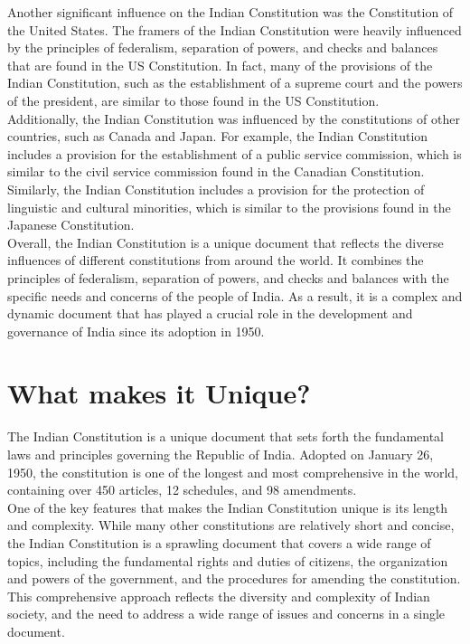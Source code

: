 \documentclass[11pt]{article}
\begin{document}
Another significant influence on the Indian Constitution was the Constitution of the United States. The framers of the Indian Constitution were heavily influenced by the principles of federalism, separation of powers, and checks and balances that are found in the US Constitution. In fact, many of the provisions of the Indian Constitution, such as the establishment of a supreme court and the powers of the president, are similar to those found in the US Constitution.\\

Additionally, the Indian Constitution was influenced by the constitutions of other countries, such as Canada and Japan. For example, the Indian Constitution includes a provision for the establishment of a public service commission, which is similar to the civil service commission found in the Canadian Constitution. Similarly, the Indian Constitution includes a provision for the protection of linguistic and cultural minorities, which is similar to the provisions found in the Japanese Constitution.\\

Overall, the Indian Constitution is a unique document that reflects the diverse influences of different constitutions from around the world. It combines the principles of federalism, separation of powers, and checks and balances with the specific needs and concerns of the people of India. As a result, it is a complex and dynamic document that has played a crucial role in the development and governance of India since its adoption in 1950.\\


\section{What makes it Unique?}

The Indian Constitution is a unique document that sets forth the fundamental laws and principles governing the Republic of India. Adopted on January 26, 1950, the constitution is one of the longest and most comprehensive in the world, containing over 450 articles, 12 schedules, and 98 amendments.\\

One of the key features that makes the Indian Constitution unique is its length and complexity. While many other constitutions are relatively short and concise, the Indian Constitution is a sprawling document that covers a wide range of topics, including the fundamental rights and duties of citizens, the organization and powers of the government, and the procedures for amending the constitution. This comprehensive approach reflects the diversity and complexity of Indian society, and the need to address a wide range of issues and concerns in a single document.\\
\end{document}
